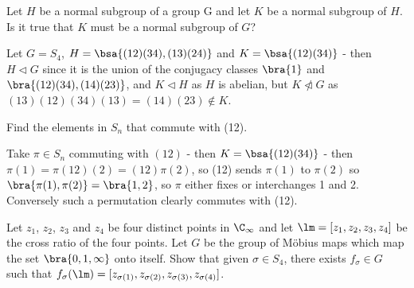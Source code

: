 \begin{problem}
Let $H$ be a normal subgroup of a group G and let $K$ be a normal subgroup of $H$. Is it true that $K$ must be a normal subgroup of $G$?
\end{problem} 

\begin{solution}[\bf Solution.]Let $G=S_4$, $H=\bsa{(12)(34),(13)(24)}$ and $K = \bsa{(12)(34)}$ - then $H\lhd G$ since it is the union of the conjugacy classes $\bra{1}$ and $\bra{(12)(34),(14)(23)}$, and $K \lhd H$ as $H$ is abelian, but $K\ntriangleleft G$ as $(13)(12)(34)(13) = (14)(23)\notin K$.

\end{solution}

\begin{problem} Find the elements in $S_n$ that commute with (12).

\end{problem} 

\begin{solution}[\bf Solution.]Take $\pi\in S_n$ commuting with $(12)$ - then $K=\bsa{(12)(34)}$ - then $\pi(1) = \pi(12)(2) = (12)\pi (2)$, so (12) sends $\pi(1)$ to $\pi(2)$ so $\bra{\pi(1),\pi(2)} = \bra{1,2}$, so $\pi$ either fixes or interchanges 1 and 2. Conversely such a permutation clearly commutes with (12).

\end{solution}

\begin{problem} Let $z_1$, $z_2$, $z_3$ and $z_4$ be four distinct points in $\C_\infty$ and let $\lm = [z_1, z_2, z_3, z_4]$ be the cross ratio of the four points. Let $G$ be the group of M\"obius maps which map the set $\bra{0,1,\infty}$ onto itself. Show that given $\sigma \in S_4$, there exists $f_\sigma \in G$ such that $f_\sigma (\lm) = [z_{\sigma(1)}, z_{\sigma(2)}, z_{\sigma(3)}, z_{\sigma(4)}]$.

\end{problem} 


